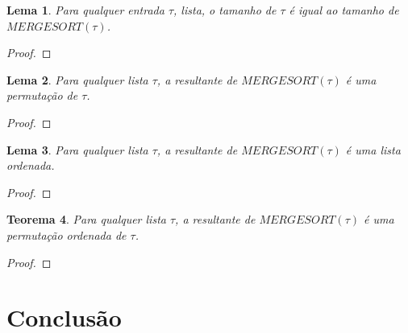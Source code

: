 \documentclass[12pt]{article}
\newtheorem{theorem}{Teorema}[section]
\newtheorem{lemma}[theorem]{Lema}
\begin{document}
\begin{lemma}
\label{mergesort-preserves-length}
        Para qualquer entrada $\tau$, lista, o tamanho de $\tau$ é igual ao tamanho de $MERGESORT(\tau)$.
\end{lemma}

\begin{proof}
        
\end{proof}

\begin{lemma}
\label{mergesort-is-permutation}
        Para qualquer lista $\tau$, a resultante de $MERGESORT(\tau)$ é uma permutação de $\tau$.
\end{lemma}

\begin{proof}
        
\end{proof}

\begin{lemma}
\label{mergesort-sorts}
        Para qualquer lista $\tau$, a resultante de $MERGESORT(\tau)$ é uma lista ordenada.
\end{lemma}

\begin{proof}
        
\end{proof}

\begin{theorem}
\label{mergesort-is-correct}
        Para qualquer lista $\tau$, a resultante de $MERGESORT(\tau)$ é uma permutação ordenada de $\tau$.
\end{theorem}

\begin{proof}
        
\end{proof}



\section{Conclusão}
\label{conclusion}



\end{document}
